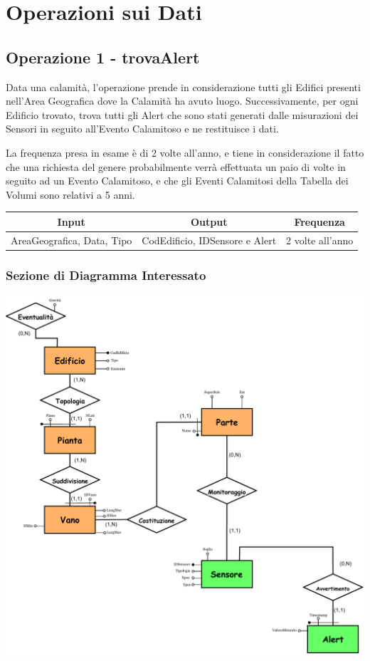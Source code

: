 \documentclass[12pt,a4paper]{report}
\begin{document}
        \chapter{Operazioni sui Dati}
        \section{Operazione 1 - trovaAlert}
        Data una calamità, l'operazione prende in considerazione tutti gli Edifici presenti nell'Area Geografica dove la Calamità ha avuto luogo. Successivamente, per ogni Edificio trovato, trova tutti gli Alert che sono stati generati dalle misurazioni dei Sensori in seguito all'Evento Calamitoso e ne restituisce i dati.
        
        La frequenza presa in esame è di 2 volte all'anno, e tiene in considerazione il fatto che una richiesta del genere probabilmente verrà effettuata un paio di volte in seguito ad un Evento Calamitoso, e che gli Eventi Calamitosi della Tabella dei Volumi sono relativi a 5 anni.
        
        \begin{center}
            \begin{tabular}{|c|c|c|}
                \hline
                \rowcolor{viola} \textbf{Input} & \textbf{Output} & \textbf{Frequenza} \\ \hline
                AreaGeografica, Data, Tipo & CodEdificio, IDSensore e Alert & 2 volte all'anno \\ \hline
            \end{tabular}
        \end{center}
        
        \subsection{Sezione di Diagramma Interessato}
        \begin{center}
            \includegraphics[scale=0.7]{sezione_operazione1.pdf}
        \end{center}
        
\end{document}
